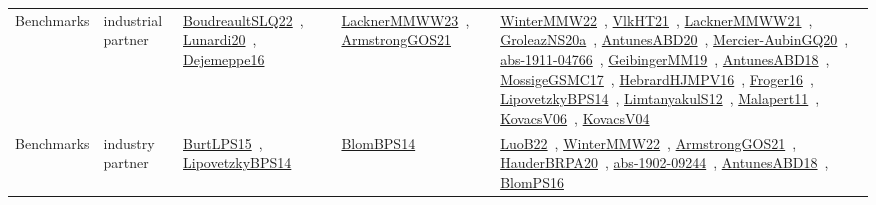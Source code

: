 {\begin{longtable}{lp{3cm}>{\raggedright\arraybackslash}p{6cm}>{\raggedright\arraybackslash}p{6cm}>{\raggedright\arraybackslash}p{8cm}}
Benchmarks & industrial partner & \href{../works/BoudreaultSLQ22.pdf}{BoudreaultSLQ22}~\cite{BoudreaultSLQ22}, \href{../works/Lunardi20.pdf}{Lunardi20}~\cite{Lunardi20}, \href{../works/Dejemeppe16.pdf}{Dejemeppe16}~\cite{Dejemeppe16} & \href{../works/LacknerMMWW23.pdf}{LacknerMMWW23}~\cite{LacknerMMWW23}, \href{../works/ArmstrongGOS21.pdf}{ArmstrongGOS21}~\cite{ArmstrongGOS21} & \href{../works/WinterMMW22.pdf}{WinterMMW22}~\cite{WinterMMW22}, \href{../works/VlkHT21.pdf}{VlkHT21}~\cite{VlkHT21}, \href{../works/LacknerMMWW21.pdf}{LacknerMMWW21}~\cite{LacknerMMWW21}, \href{../works/GroleazNS20a.pdf}{GroleazNS20a}~\cite{GroleazNS20a}, \href{../works/AntunesABD20.pdf}{AntunesABD20}~\cite{AntunesABD20}, \href{../works/Mercier-AubinGQ20.pdf}{Mercier-AubinGQ20}~\cite{Mercier-AubinGQ20}, \href{../works/abs-1911-04766.pdf}{abs-1911-04766}~\cite{abs-1911-04766}, \href{../works/GeibingerMM19.pdf}{GeibingerMM19}~\cite{GeibingerMM19}, \href{../works/AntunesABD18.pdf}{AntunesABD18}~\cite{AntunesABD18}, \href{../works/MossigeGSMC17.pdf}{MossigeGSMC17}~\cite{MossigeGSMC17}, \href{../works/HebrardHJMPV16.pdf}{HebrardHJMPV16}~\cite{HebrardHJMPV16}, \href{../works/Froger16.pdf}{Froger16}~\cite{Froger16}, \href{../works/LipovetzkyBPS14.pdf}{LipovetzkyBPS14}~\cite{LipovetzkyBPS14}, \href{../works/LimtanyakulS12.pdf}{LimtanyakulS12}~\cite{LimtanyakulS12}, \href{../works/Malapert11.pdf}{Malapert11}~\cite{Malapert11}, \href{../works/KovacsV06.pdf}{KovacsV06}~\cite{KovacsV06}, \href{../works/KovacsV04.pdf}{KovacsV04}~\cite{KovacsV04}\\
Benchmarks & industry partner & \href{../works/BurtLPS15.pdf}{BurtLPS15}~\cite{BurtLPS15}, \href{../works/LipovetzkyBPS14.pdf}{LipovetzkyBPS14}~\cite{LipovetzkyBPS14} & \href{../works/BlomBPS14.pdf}{BlomBPS14}~\cite{BlomBPS14} & \href{../works/LuoB22.pdf}{LuoB22}~\cite{LuoB22}, \href{../works/WinterMMW22.pdf}{WinterMMW22}~\cite{WinterMMW22}, \href{../works/ArmstrongGOS21.pdf}{ArmstrongGOS21}~\cite{ArmstrongGOS21}, \href{../works/HauderBRPA20.pdf}{HauderBRPA20}~\cite{HauderBRPA20}, \href{../works/abs-1902-09244.pdf}{abs-1902-09244}~\cite{abs-1902-09244}, \href{../works/AntunesABD18.pdf}{AntunesABD18}~\cite{AntunesABD18}, \href{../works/BlomPS16.pdf}{BlomPS16}~\cite{BlomPS16}\\

\end{longtable}}
